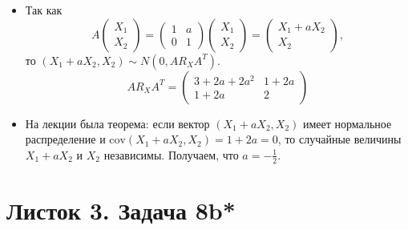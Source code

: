 \begin{itemize}
 \item Так как 
 \[
    A 
    \begin{pmatrix}
        X_1 \\ X_2
    \end{pmatrix} = 
    \begin{pmatrix}
        1 & a \\ 0 & 1
    \end{pmatrix} \begin{pmatrix}
        X_1 \\ X_2
    \end{pmatrix} = \begin{pmatrix}
        X_1 + aX_2 \\ X_2
    \end{pmatrix},
 \]
 то $\left(X_1 + aX_2, X_2\right) \sim N\left(0, AR_X A ^ T\right)$.
 \[
    A R_X A ^ T = \begin{pmatrix}
    3 + 2a + 2a ^ 2 & 1 + 2a \\ 
    1 + 2a & 2
    \end{pmatrix}
 \]
 \item На лекции была теорема: если вектор $\left(X_1 + aX_2, X_2\right)$ имеет нормальное распределение и $\text{cov}\left(X_1 + aX_2, X_2\right) = 1 + 2a = 0$, то случайные величины $X_1 + aX_2$ и $X_2$ независимы. Получаем, что $a = -\frac 1 2 $.
\end{itemize}

\section{Листок 3. Задача 8b*}

